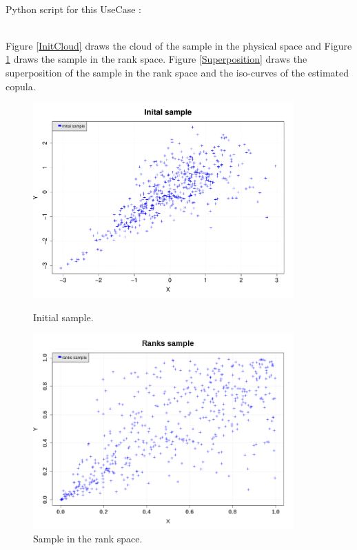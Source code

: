              \textspace\\
             Python script for this UseCase :


             \textspace\\


             Figure \ref{InitCloud} draws the cloud of the sample in the physical  space and  Figure \ref{RankCloud} draws the sample in the rank space. Figure \ref{Superposition} draws the superposition of the sample in the rank space and the iso-curves of the estimated copula.



             \begin{figure}[H]
               \begin{minipage}{10cm}
                 \begin{center}
                   \includegraphics[width=10cm]{Figures/initSample.pdf}
                 \end{center}
                 \caption{Initial sample.}
                 \label{InitCloud}
               \end{minipage}
               \hfill
               \begin{minipage}{10cm}
                 \begin{center}
                   \includegraphics[width=10cm]{Figures/ranksSample.png}
                 \end{center}
                 \caption{Sample in the rank space.}
                 \label{RankCloud}
               \end{minipage}
             \end{figure}



